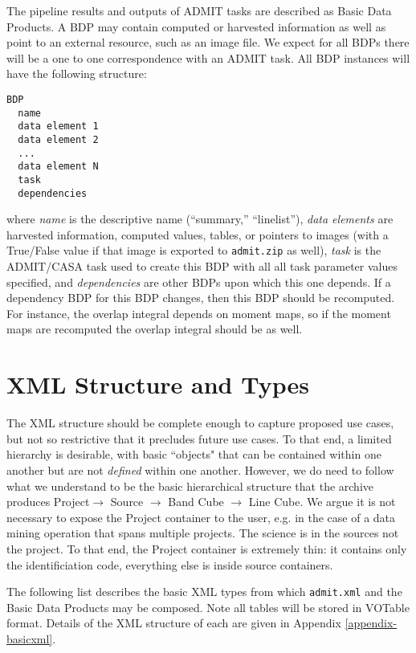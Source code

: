 \documentclass{article}
\begin{document}
The pipeline results and outputs of ADMIT tasks are described as Basic
Data Products. A BDP may contain computed or harvested information as
well as point to an external resource, such as an image file.  We expect 
for all BDPs there will be a one to one correspondence with an ADMIT task.
All BDP instances will have the following structure:

\begin{verbatim}
BDP
  name 
  data element 1
  data element 2
  ...
  data element N
  task
  dependencies
\end{verbatim}

\noindent where {\it name} is the descriptive name (``summary,''
``linelist''), {\it data elements} are harvested information, computed 
values, tables, or pointers to images (with a True/False value if that
image is exported to {\tt admit.zip} as well),
{\it task} is the ADMIT/CASA 
task used to create this BDP with all all task parameter values specified,
and {\it dependencies} are other BDPs upon which this one depends. 
If a dependency BDP for this BDP changes, then this BDP should be recomputed.
For instance, the overlap integral depends on moment maps, so if the moment
maps are recomputed the overlap integral should be as well.


\section{XML Structure and Types}

The XML structure should be complete enough to capture proposed use cases,
but not so restrictive that it precludes future use cases. To that end, a
limited hierarchy is desirable, with basic ``objects" that can be contained
within one another but are not {\it defined} within one another.  However, we
do need to follow what we understand to be the basic hierarchical structure
that the archive produces 
Project$\rightarrow$ Source $\rightarrow$ Band Cube $\rightarrow$ Line Cube.
We argue it is not necessary to expose the Project container to
the user, e.g. in the case of a data mining operation that spans multiple
projects. The science is in the sources not the project. To that end, the
Project container is extremely thin: it contains only the identificiation
code, everything else is inside source containers.

The following list describes the basic XML types from which {\tt admit.xml} and the Basic
Data Products may be composed.  Note all tables will be stored in VOTable
format.  Details of the XML structure of each are given in Appendix
\ref{appendix-basicxml}.
\end{document}
